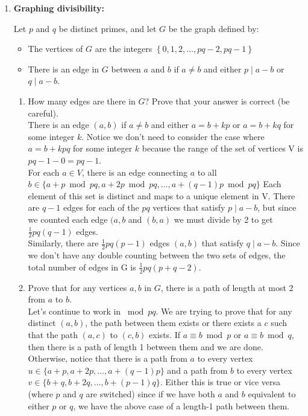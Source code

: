 \documentclass[11pt,fleqn]{article}
\begin{document}
\begin{enumerate}
\newpage
\item \textbf{Graphing divisibility:}

Let $p$ and $q$ be distinct primes,
and let $G$ be the graph defined by:
\begin{itemize}
\item The vertices of $G$ are the integers $\left\{0, 1, 2, \ldots, pq-2,pq-1\right\}$
\item There is an edge in $G$ between $a$ and $b$
if $a \neq b$ and either $p \mid a - b$ or $q \mid a - b$.
\end{itemize}
\begin{enumerate}
\item How many edges are there in $G$?
Prove that your answer is correct (be careful). \\
There is an edge $(a,b)$ if $a\neq b$ and either $a=b+kp$ or $a=b+kq$ for some integer $k$. Notice we don't need to consider the case where $a=b+kpq$ for some integer $k$ because the range of the set of vertices V is $pq-1-0 = pq-1$. \\
For each $a \in V$, there is an edge connecting $a$ to all $b \in \{a+p\bmod{pq},a+2p\bmod{pq},\ldots,a+(q-1)p\bmod{pq}\}$ Each element of this set is distinct and maps to a unique element in V. There are $q-1$ edges for each of the $pq$ vertices that satisfy $p \mid a-b$, but since we counted each edge $(a,b$ and $(b,a)$ we must divide by 2 to get $\frac{1}{2} pq(q-1)$ edges. \\
Similarly, there are $\frac{1}{2} pq(p-1)$ edges $(a,b)$ that satisfy $q \mid a-b$. Since we don't have any double counting between the two sets of edges, the total number of edges in G is $\frac12 pq(p+q-2)$.
\item Prove that for any vertices $a, b$ in $G$,
there is a path of length at most 2 from $a$ to $b$. \\
Let's continue to work in $\bmod{pq}$. We are trying to prove that for any distinct $(a,b)$, the path between them exists or there exists a $c$ such that the path $(a,c)$ to $(c,b)$ exists. If $a \equiv b \bmod p$ or $a \equiv b \bmod q$, then there is a path of length 1 between them and we are done. \\
Otherwise, notice that there is a path from $a$ to every vertex $u \in \{a+p,a+2p,\ldots,a+(q-1)p\}$ and a path from $b$ to every vertex $v \in \{b+q,b+2q,\ldots,b+(p-1)q\}$. Either this is true or vice versa (where $p$ and $q$ are switched) since if we have both $a$ and $b$ equivalent to either $p$ or $q$, we have the above case of a length-1 path between them. \\
\end{enumerate}


\end{enumerate}
\end{document}
